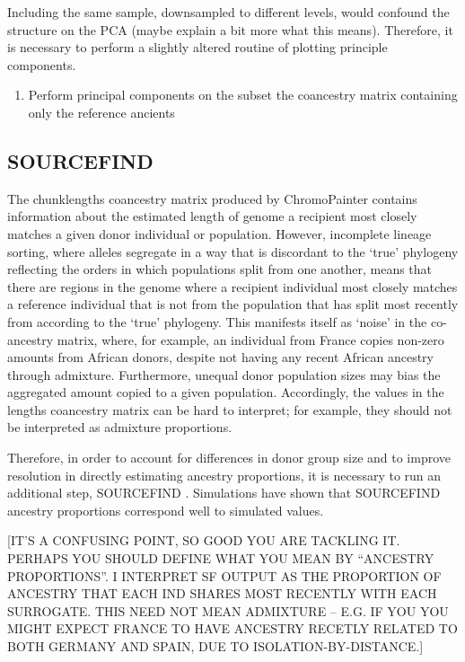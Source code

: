 Including the same sample, downsampled to different levels, would confound the structure on the PCA (maybe explain a bit more what this means). Therefore, it is necessary to perform a slightly altered routine of plotting principle components. 

\begin{enumerate}
\item Perform principal components on the subset the coancestry matrix containing only the reference ancients
\end{enumerate}



\subsection{SOURCEFIND}

The chunklengths coancestry matrix produced by ChromoPainter contains information about the estimated length of genome a recipient most closely matches a given donor individual or population. However, incomplete lineage sorting, where alleles segregate in a way that is discordant to the `true' phylogeny reflecting the orders in which populations split from one another, means that there are regions in the genome where a recipient individual most closely matches a reference individual that is not from the population that has split most recently from according to the `true' phylogeny. This manifests itself as `noise' in the co-ancestry matrix, where, for example, an individual from France copies non-zero amounts from African donors, despite not having any recent African ancestry through admixture.  Furthermore, unequal donor population sizes may bias the aggregated amount copied to a given population. Accordingly, the values in the lengths coancestry matrix can be hard to interpret; for example, they should not be interpreted as admixture proportions. 

Therefore, in order to account for differences in donor group size and to improve resolution in directly estimating ancestry proportions, it is necessary to run an additional step, SOURCEFIND \cite{Chacon-Duque2018}. Simulations have shown that SOURCEFIND ancestry proportions correspond well to simulated values. 


{\color{red}[IT'S A CONFUSING POINT, SO GOOD YOU ARE TACKLING IT. PERHAPS YOU SHOULD DEFINE WHAT YOU MEAN BY ``ANCESTRY PROPORTIONS''. I INTERPRET SF OUTPUT AS THE PROPORTION OF ANCESTRY THAT EACH IND SHARES MOST RECENTLY WITH EACH SURROGATE. THIS NEED NOT MEAN ADMIXTURE -- E.G. IF YOU YOU MIGHT EXPECT FRANCE TO HAVE ANCESTRY RECETLY RELATED TO BOTH GERMANY AND SPAIN, DUE TO ISOLATION-BY-DISTANCE.]}

